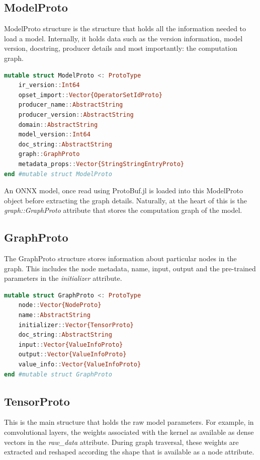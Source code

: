 \documentclass{juliacon}
\begin{document}
\subsection{ModelProto}

ModelProto structure is the structure that holds all the information needed to load a model. Internally, it holds
data such as the version information, model version, docstring, producer details and most importantly: the 
computation graph. \newpage

\begin{lstlisting}[language=julia]
mutable struct ModelProto <: ProtoType
    ir_version::Int64
    opset_import::Vector{OperatorSetIdProto}
    producer_name::AbstractString
    producer_version::AbstractString
    domain::AbstractString
    model_version::Int64
    doc_string::AbstractString
    graph::GraphProto
    metadata_props::Vector{StringStringEntryProto}
end #mutable struct ModelProto
\end{lstlisting}

An ONNX model, once read using ProtoBuf.jl is loaded into this ModelProto object before extracting the graph 
details. Naturally, at the heart of this is the \textit{graph::GraphProto} attribute that stores the computation
graph of the model.

\subsection{GraphProto}

The GraphProto structure stores information about particular nodes in the graph. This includes
the node metadata, name, input, output and the pre-trained parameters in the \textit{initializer} attribute.

\begin{lstlisting}[language=julia]
mutable struct GraphProto <: ProtoType
    node::Vector{NodeProto}
    name::AbstractString
    initializer::Vector{TensorProto}
    doc_string::AbstractString
    input::Vector{ValueInfoProto}
    output::Vector{ValueInfoProto}
    value_info::Vector{ValueInfoProto}
end #mutable struct GraphProto
\end{lstlisting}

\subsection{TensorProto}
This is the main structure that holds the raw model parameters. For example, in comvolutional layers, the weights
associated with the kernel as available as dense vectors in the \textit{raw\_data} attribute. During graph
traversal, these weights are extracted and reshaped according the shape that is available as a node attribute.
\end{document}
